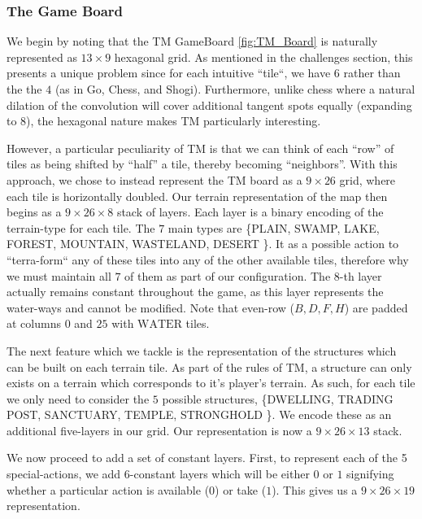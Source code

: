 \documentclass[12pt,twocolumn,letterpaper]{article}
\begin{document}
\subsubsection{The Game Board}
\label{subsubsection:the_game_board}

We begin by noting that the TM GameBoard \ref{fig:TM_Board} is naturally represented as $13 \times 9$ hexagonal grid. As mentioned in the challenges section, this presents a unique problem since for each intuitive ``tile``, we have $6$ rather than the the $4$ (as in Go, Chess, and Shogi). Furthermore, unlike chess where a natural dilation of the convolution will cover additional tangent spots equally (expanding to $8$), the hexagonal nature makes TM particularly interesting.

However, a particular peculiarity of TM is that we can think of each ``row'' of tiles as being shifted by ``half'' a tile, thereby becoming ``neighbors''. With this approach, we chose to instead represent the TM board as a $9 \times 26$ grid, where each tile is horizontally doubled. Our terrain representation of the map then begins as a $9 \times 26 \times 8$ stack of layers. Each layer is a binary encoding of the terrain-type for each tile. The $7$ main types are \{PLAIN, SWAMP, LAKE, FOREST, MOUNTAIN, WASTELAND, DESERT \}. It as a possible action to ``terra-form`` any of these tiles into any of the other available tiles, therefore why we must maintain all $7$ of them as part of our configuration. The $8$-th layer actually remains constant throughout the game, as this layer represents the water-ways and cannot be modified. Note that even-row ($B, D, F, H$) are padded at columns $0$ and $25$ with $\text{WATER}$ tiles.

The next feature which we tackle is the representation of the structures which can be built on each terrain tile. As part of the rules of TM, a structure can only exists on a terrain which corresponds to it's player's terrain. As such, for each tile we only need to consider the $5$ possible structures, \{DWELLING, TRADING POST, SANCTUARY, TEMPLE, STRONGHOLD \}. We encode these as an additional five-layers in our grid. Our representation is now a $9 \times 26 \times 13$ stack.

We now proceed to add a set of constant layers. First, to represent each of the 5 special-actions, we add $6$-constant layers which will be either $0$ or $1$ signifying whether a particular action is available ($0$) or take ($1$). This gives us a $9 \times 26 \times 19$ representation.
\end{document}
